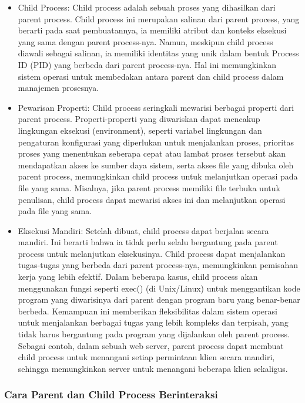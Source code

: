 \documentclass[12pt]{article}
\begin{document}
\begin{itemize}
    
    \item{Child Process:} Child process adalah sebuah proses yang dihasilkan dari parent process. Child process ini merupakan salinan dari parent process, yang berarti pada saat pembuatannya, ia memiliki atribut dan konteks eksekusi yang sama dengan parent process-nya. Namun, meskipun child process diawali sebagai salinan, ia memiliki identitas yang unik dalam bentuk Process ID (PID) yang berbeda dari parent process-nya. Hal ini memungkinkan sistem operasi untuk membedakan antara parent dan child process dalam manajemen prosesnya.
    
    \item{Pewarisan Properti:} Child process seringkali mewarisi berbagai properti dari parent process. Properti-properti yang diwariskan dapat mencakup lingkungan eksekusi (environment), seperti variabel lingkungan dan pengaturan konfigurasi yang diperlukan untuk menjalankan proses, prioritas proses yang menentukan seberapa cepat atau lambat proses tersebut akan mendapatkan akses ke sumber daya sistem, serta akses file yang dibuka oleh parent process, memungkinkan child process untuk melanjutkan operasi pada file yang sama. Misalnya, jika parent process memiliki file terbuka untuk penulisan, child process dapat mewarisi akses ini dan melanjutkan operasi pada file yang sama.
    
    \item{Eksekusi Mandiri:} Setelah dibuat, child process dapat berjalan secara mandiri. Ini berarti bahwa ia tidak perlu selalu bergantung pada parent process untuk melanjutkan eksekusinya. Child process dapat menjalankan tugas-tugas yang berbeda dari parent process-nya, memungkinkan pemisahan kerja yang lebih efektif. Dalam beberapa kasus, child process akan menggunakan fungsi seperti exec() (di Unix/Linux) untuk menggantikan kode program yang diwarisinya dari parent dengan program baru yang benar-benar berbeda. Kemampuan ini memberikan fleksibilitas dalam sistem operasi untuk menjalankan berbagai tugas yang lebih kompleks dan terpisah, yang tidak harus bergantung pada program yang dijalankan oleh parent process. Sebagai contoh, dalam sebuah web server, parent process dapat membuat child process untuk menangani setiap permintaan klien secara mandiri, sehingga memungkinkan server untuk menangani beberapa klien sekaligus.
\end{itemize}

\subsubsection{Cara Parent dan Child Process Berinteraksi}
\end{document}
